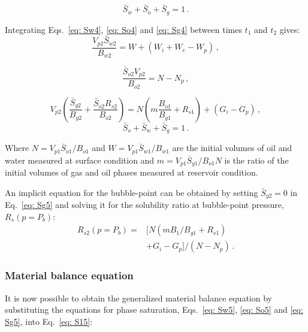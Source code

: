 \documentclass[final,authoryear,5p,twocolumn,10pt]{elsarticle}
\begin{document}
\begin{equation}\label{eq: S14}
\bar{S}_w+\bar{S}_o+\bar{S}_g=1 \, .
\end{equation}

Integrating Eqs.~\eqref{eq: Sw4}, \eqref{eq: So4} and \eqref{eq: Sg4} between times $t_1$ and $t_2$ gives:
\begin{equation}\label{eq: Sw5}
\frac{V_{p2} \bar{S}_{w2}}{B_{w2}}=W+\left(W_i+W_e-W_p\right) \, ,
\end{equation}

\begin{equation}\label{eq: So5}
\frac{\bar{S}_{o2} V_{p2}}{B_{o2}} = N-N_p \, ,
\end{equation}

\begin{equation}\label{eq: Sg5}
V_{p2}\left(\frac{\bar{S}_{g2}}{B_{g2}} +\frac{\bar{S}_{o2} R_{s2}}{B_{o2}}\right) = N\left(m\frac{B_{o1}}{B_{g1}} + R_{s1}\right) +\left(G_i-G_p\right) \, ,
\end{equation}
%
\begin{equation}\label{eq: S15}
\bar{S}_o+\bar{S}_w+\bar{S}_g=1 \, .
\end{equation}

Where $N=V_{p1} \bar{S}_{o1}/B_{o1}$ and $W=V_{p1} \bar{S}_{w1}/B_{w1}$ are the initial volumes of oil and water measured at surface condition and $m=V_{p1} \bar{S}_{g1}/B_{o1} N$ is the ratio of the initial volumes of gas and oil phases measured at reservoir condition.

An implicit equation for the bubble-point can be obtained by setting $\bar{S}_{g2}=0$ in Eq.~\eqref{eq: Sg5} and solving it for the solubility ratio at bubble-point pressure, $R_s(p=P_b)$:
\begin{equation}\label{eq: eqPb}
\begin{split}
R_{s2}\left(p=P_b\right) = &\Big[N\left(m B_{1}/B_{g1} +R_{s1}\right)\\
&+G_i-G_p\Big]/\left(N-N_p\right) \, .
\end{split}
\end{equation}

\subsubsection{Material balance equation}

It is now possible to obtain the generalized material balance equation by substituting the equations for phase saturation, Eqs.~\eqref{eq: Sw5}, \eqref{eq: So5} and \eqref{eq: Sg5}, into Eq.~\eqref{eq: S15}:  
\end{document}
